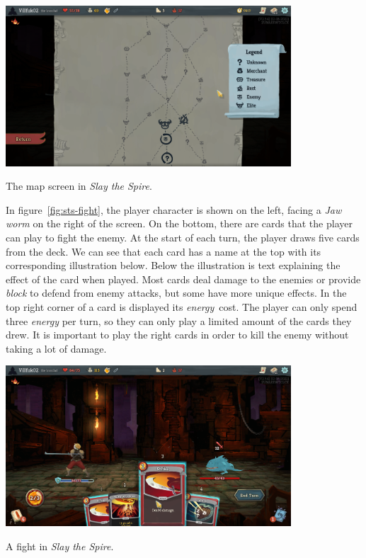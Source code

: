 \begin{center}
    \captionsetup{type=figure}
    \includegraphics[width=0.8\textwidth]{img/Slay-the-Spire-Map.png}
    \caption{The map screen in \emph{Slay the Spire}.}
    \label{fig:sts-map}
\end{center}

In figure~\ref{fig:sts-fight}, the player character is shown on the left, facing a \emph{Jaw worm} on the right of the screen.
On the bottom, there are cards that the player can play to fight the enemy.
At the start of each turn, the player draws five cards from the deck.
We can see that each card has a name at the top with its corresponding illustration below.
Below the illustration is text explaining the effect of the card when played.
Most cards deal damage to the enemies or provide \emph{block} to defend from enemy attacks, but some have more unique effects.
In the top right corner of a card is displayed its \emph{energy}~cost.
The player can only spend three \emph{energy} per turn, so they can only play a limited amount of the cards they drew.
It is important to play the right cards in order to kill the enemy without taking a lot of damage.

\begin{center}
    \captionsetup{type=figure}
    \includegraphics[width=0.8\textwidth]{img/Slay-the-Spire-Fight.png}
    \caption{A fight in \emph{Slay the Spire}.}
    \label{fig:sts-fight}
\end{center}

